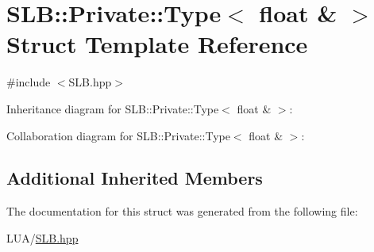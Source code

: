 \hypertarget{structSLB_1_1Private_1_1Type_3_01float_01_6_01_4}{}\section{S\+LB\+:\+:Private\+:\+:Type$<$ float \& $>$ Struct Template Reference}
\label{structSLB_1_1Private_1_1Type_3_01float_01_6_01_4}


{\ttfamily \#include $<$S\+L\+B.\+hpp$>$}



Inheritance diagram for S\+LB\+:\+:Private\+:\+:Type$<$ float \& $>$\+:


Collaboration diagram for S\+LB\+:\+:Private\+:\+:Type$<$ float \& $>$\+:
\subsection*{Additional Inherited Members}


The documentation for this struct was generated from the following file\+:\begin{DoxyCompactItemize}
\item 
L\+U\+A/\hyperlink{SLB_8hpp}{S\+L\+B.\+hpp}\end{DoxyCompactItemize}
